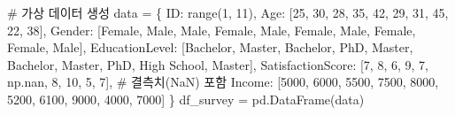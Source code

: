 \documentclass[
  letterpaper,
]{book}
\newenvironment{Shaded}{\begin{snugshade}}{\end{snugshade}}
\newcommand{\BuiltInTok}[1]{\textcolor[rgb]{0.00,0.23,0.31}{#1}}
\newcommand{\CommentTok}[1]{\textcolor[rgb]{0.37,0.37,0.37}{#1}}
\newcommand{\DecValTok}[1]{\textcolor[rgb]{0.68,0.00,0.00}{#1}}
\newcommand{\NormalTok}[1]{\textcolor[rgb]{0.00,0.23,0.31}{#1}}
\newcommand{\OperatorTok}[1]{\textcolor[rgb]{0.37,0.37,0.37}{#1}}
\newcommand{\StringTok}[1]{\textcolor[rgb]{0.13,0.47,0.30}{#1}}
\begin{document}
\begin{Shaded}
\begin{Highlighting}[]
\CommentTok{\# 가상 데이터 생성}
\NormalTok{data }\OperatorTok{=}\NormalTok{ \{}
    \StringTok{\textquotesingle{}ID\textquotesingle{}}\NormalTok{: }\BuiltInTok{range}\NormalTok{(}\DecValTok{1}\NormalTok{, }\DecValTok{11}\NormalTok{),}
    \StringTok{\textquotesingle{}Age\textquotesingle{}}\NormalTok{: [}\DecValTok{25}\NormalTok{, }\DecValTok{30}\NormalTok{, }\DecValTok{28}\NormalTok{, }\DecValTok{35}\NormalTok{, }\DecValTok{42}\NormalTok{, }\DecValTok{29}\NormalTok{, }\DecValTok{31}\NormalTok{, }\DecValTok{45}\NormalTok{, }\DecValTok{22}\NormalTok{, }\DecValTok{38}\NormalTok{],}
    \StringTok{\textquotesingle{}Gender\textquotesingle{}}\NormalTok{: [}\StringTok{\textquotesingle{}Female\textquotesingle{}}\NormalTok{, }\StringTok{\textquotesingle{}Male\textquotesingle{}}\NormalTok{, }\StringTok{\textquotesingle{}Male\textquotesingle{}}\NormalTok{, }\StringTok{\textquotesingle{}Female\textquotesingle{}}\NormalTok{, }\StringTok{\textquotesingle{}Male\textquotesingle{}}\NormalTok{, }\StringTok{\textquotesingle{}Female\textquotesingle{}}\NormalTok{, }\StringTok{\textquotesingle{}Male\textquotesingle{}}\NormalTok{, }\StringTok{\textquotesingle{}Female\textquotesingle{}}\NormalTok{, }\StringTok{\textquotesingle{}Female\textquotesingle{}}\NormalTok{, }\StringTok{\textquotesingle{}Male\textquotesingle{}}\NormalTok{],}
    \StringTok{\textquotesingle{}EducationLevel\textquotesingle{}}\NormalTok{: [}\StringTok{\textquotesingle{}Bachelor\textquotesingle{}}\NormalTok{, }\StringTok{\textquotesingle{}Master\textquotesingle{}}\NormalTok{, }\StringTok{\textquotesingle{}Bachelor\textquotesingle{}}\NormalTok{, }\StringTok{\textquotesingle{}PhD\textquotesingle{}}\NormalTok{, }\StringTok{\textquotesingle{}Master\textquotesingle{}}\NormalTok{, }\StringTok{\textquotesingle{}Bachelor\textquotesingle{}}\NormalTok{, }\StringTok{\textquotesingle{}Master\textquotesingle{}}\NormalTok{, }\StringTok{\textquotesingle{}PhD\textquotesingle{}}\NormalTok{, }\StringTok{\textquotesingle{}High School\textquotesingle{}}\NormalTok{, }\StringTok{\textquotesingle{}Master\textquotesingle{}}\NormalTok{],}
    \StringTok{\textquotesingle{}SatisfactionScore\textquotesingle{}}\NormalTok{: [}\DecValTok{7}\NormalTok{, }\DecValTok{8}\NormalTok{, }\DecValTok{6}\NormalTok{, }\DecValTok{9}\NormalTok{, }\DecValTok{7}\NormalTok{, np.nan, }\DecValTok{8}\NormalTok{, }\DecValTok{10}\NormalTok{, }\DecValTok{5}\NormalTok{, }\DecValTok{7}\NormalTok{], }\CommentTok{\# 결측치(NaN) 포함}
    \StringTok{\textquotesingle{}Income\textquotesingle{}}\NormalTok{: [}\DecValTok{5000}\NormalTok{, }\DecValTok{6000}\NormalTok{, }\DecValTok{5500}\NormalTok{, }\DecValTok{7500}\NormalTok{, }\DecValTok{8000}\NormalTok{, }\DecValTok{5200}\NormalTok{, }\DecValTok{6100}\NormalTok{, }\DecValTok{9000}\NormalTok{, }\DecValTok{4000}\NormalTok{, }\DecValTok{7000}\NormalTok{]}
\NormalTok{\}}
\NormalTok{df\_survey }\OperatorTok{=}\NormalTok{ pd.DataFrame(data)}


\end{Highlighting}
\end{Shaded}
\end{document}

